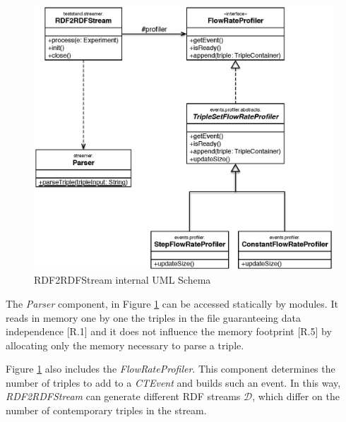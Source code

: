 \begin{figure}[tbh]
  \centering
	\includegraphics[width=0.75\linewidth]{images/uml_flowrateprofiler}
	\caption{RDF2RDFStream internal UML Schema} 
  	\label{fig:uml_flowrateprofiler}
\end{figure}


The \textit{Parser} component, in Figure \ref{fig:uml_flowrateprofiler} can be accessed statically by \name modules. It reads in memory one by one the triples in the file guaranteeing data independence [R.1] and it does not influence the memory footprint [R.5] by allocating only the memory necessary to parse a triple. 

Figure \ref{fig:uml_flowrateprofiler} also includes the \textit{FlowRateProfiler}. This component determines the number of triples to add to a \textit{CTEvent} and builds such an event. In this way, \textit{RDF2RDFStream} can generate different RDF streams $\mathcal{D}$, which differ on the number of contemporary triples in the stream. 

